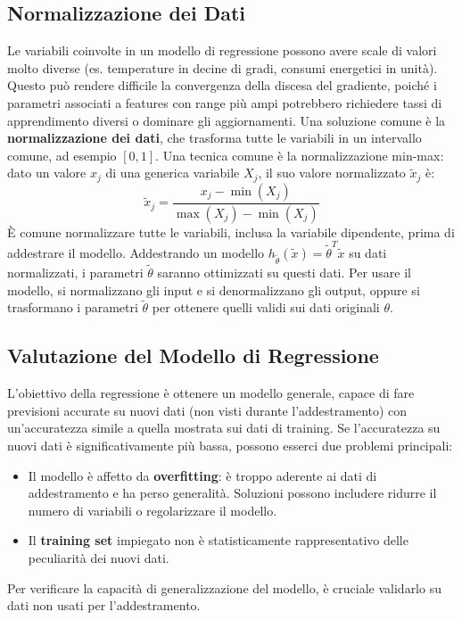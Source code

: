 \documentclass{article}
\begin{document}
\subsection{Normalizzazione dei Dati}
Le variabili coinvolte in un modello di regressione possono avere scale di valori molto diverse (es. temperature in decine di gradi, consumi energetici in unità). Questo può rendere difficile la convergenza della discesa del gradiente, poiché i parametri associati a features con range più ampi potrebbero richiedere tassi di apprendimento diversi o dominare gli aggiornamenti.
Una soluzione comune è la \textbf{normalizzazione dei dati}, che trasforma tutte le variabili in un intervallo comune, ad esempio $[0, 1]$.
Una tecnica comune è la normalizzazione min-max: dato un valore $x_j$ di una generica variabile $X_j$, il suo valore normalizzato $\tilde{x}_j$ è:
$$ \tilde{x}_j = \frac{x_j - \min(X_j)}{\max(X_j) - \min(X_j)} $$
È comune normalizzare tutte le variabili, inclusa la variabile dipendente, prima di addestrare il modello.
Addestrando un modello $h_{\tilde{\theta}}(\tilde{x}) = \tilde{\theta}^T \tilde{x}$ su dati normalizzati, i parametri $\tilde{\theta}$ saranno ottimizzati su questi dati. Per usare il modello, si normalizzano gli input e si denormalizzano gli output, oppure si trasformano i parametri $\tilde{\theta}$ per ottenere quelli validi sui dati originali $\theta$.

\subsection{Valutazione del Modello di Regressione}
L'obiettivo della regressione è ottenere un modello generale, capace di fare previsioni accurate su nuovi dati (non visti durante l'addestramento) con un'accuratezza simile a quella mostrata sui dati di training.
Se l'accuratezza su nuovi dati è significativamente più bassa, possono esserci due problemi principali:
\begin{itemize}
    \item Il modello è affetto da \textbf{overfitting}: è troppo aderente ai dati di addestramento e ha perso generalità. Soluzioni possono includere ridurre il numero di variabili o regolarizzare il modello.
    \item Il \textbf{training set} impiegato non è statisticamente rappresentativo delle peculiarità dei nuovi dati.
\end{itemize}
Per verificare la capacità di generalizzazione del modello, è cruciale validarlo su dati non usati per l'addestramento.
\end{document}
